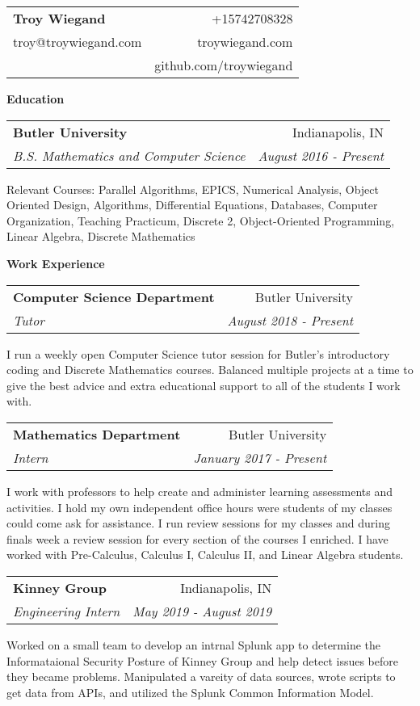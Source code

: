\documentclass[letterpaper,11pt]{article}
\makeatletter
\newcommand{\resheading}[1]{ \begin{trixiematel}\textbf{#1}\end{trixiematel}}
\newcommand{\ressubheading}[4]{
\begin{tabular*}{6.5in}{l@{\extracolsep{\fill}}r}
                \textbf{#1} & #2 \\
                \textit{#3} & \textit{#4} \\
\end{tabular*}\vspace{2pt}}
\newcommand{\Heading}[5]{
    \begin{tabular*}{7in}{l@{\extracolsep{\fill}}r}
        \textbf{\Large #1}  & #2\\
        #3 & #4 \\
        & #5 \\
        \end{tabular*}}
\makeatother
\begin{document}
\Heading{Troy Wiegand}{+15742708328}{troy@troywiegand.com}{troywiegand.com}{github.com/troywiegand}
\vspace{0.1in}

\resheading{Education}
\begin{description}
\item
\ressubheading{Butler University}{Indianapolis, IN}{B.S. Mathematics and Computer Science}{August 2016 - Present} 


Relevant Courses: Parallel Algorithms, EPICS, Numerical Analysis, Object Oriented Design, Algorithms, Differential Equations, Databases, Computer Organization, Teaching Practicum, Discrete 2, Object-Oriented Programming, Linear Algebra, Discrete Mathematics

\end{description}

\resheading{Work Experience}
\begin{description}
\item
\ressubheading{Computer Science Department}{Butler University}{Tutor}{August 2018 - Present} 


I run a weekly open Computer Science tutor session for Butler's introductory coding and Discrete Mathematics courses.  Balanced multiple projects at a time to give the best advice and extra educational support to all of the students I work with.

\item
\ressubheading{Mathematics Department}{Butler University}{Intern}{January 2017 - Present} 


I work with professors to help create and administer learning assessments and activities. I hold my own independent office hours were students of my classes could come ask for assistance. I run review sessions for my classes and during finals week a review session for every section of the courses I enriched. I have worked with Pre-Calculus, Calculus I, Calculus II, and Linear Algebra students.

\item
\ressubheading{Kinney Group}{Indianapolis, IN}{Engineering Intern}{May 2019 - August 2019} 


Worked on a small team to develop an intrnal Splunk app to determine the Informataional Security Posture of Kinney Group and help detect issues before they became problems. Manipulated a vareity of data sources, wrote scripts to get data from APIs, and utilized the Splunk Common Information Model.


 \end{description}
\end{document}
